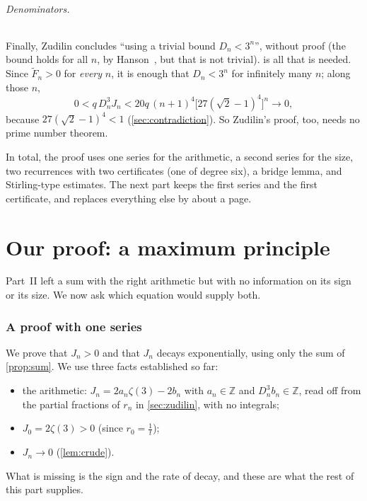 \documentclass[11pt]{article}
\newcommand{\Z}{\mathbb{Z}}
\newcommand{\Dn}{D_n}
\theoremstyle{plain}
\theoremstyle{definition}
\theoremstyle{remark}
\begin{document}
\paragraph{Denominators.} Finally, Zudilin concludes ``using a trivial bound $\Dn<3^n$'', without
proof (the bound holds for all $n$, by Hanson~\cite{hanson}, but that is not trivial).  is all that is needed. Since $\widetilde F_n>0$ for \emph{every} $n$, it is enough
that $\Dn<3^n$ for infinitely many $n$; along those $n$,
\[
  0<q\,\Dn^3J_n<20q\,(n+1)^4\bigl[27(\sqrt2-1)^4\bigr]^n\longrightarrow0,
\]
because $27(\sqrt2-1)^4<1$ (\cref{sec:contradiction}). So Zudilin's proof, too, needs no prime number
theorem.

\medskip
In total, the proof uses one series for the arithmetic, a second series for the size, two recurrences with two
certificates (one of degree six), a bridge lemma, and Stirling-type estimates. The next part keeps the first series and the first certificate, and replaces everything
else by about a page.

\part{Our proof: a maximum principle}\label{part:ours}

Part~II left a sum with the right arithmetic but with no information on its sign or its size. We
now ask which equation would supply both.

\section{A proof with one series}\label{sec:ours}

We prove that $J_n>0$ and that $J_n$ decays exponentially, using only the sum of
\cref{prop:sum}. We use three facts established so far:
\begin{itemize}
  \item the arithmetic: $J_n=2a_n\zeta(3)-2b_n$ with $a_n\in\Z$ and $\Dn^3b_n\in\Z$, read off from the
    partial fractions of $r_n$ in \cref{sec:zudilin}, with no integrals;
  \item $J_0=2\zeta(3)>0$ (since $r_0=\frac1t$);
  \item $J_n\to0$ (\cref{lem:crude}).
\end{itemize}
What is missing is the sign and the rate of decay, and these are what the rest of this part
supplies.
\end{document}
